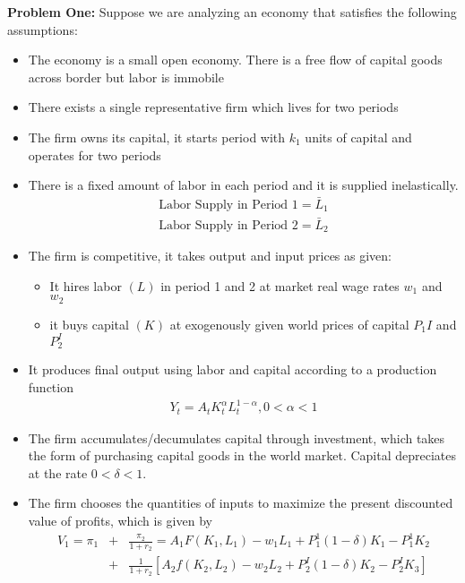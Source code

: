 \documentclass[11pt]{SelfArxOneColBMN}
\affiliation{\textsuperscript{1}\textit{John E. Walker Department of Economics,
Clemson University,Clemson, SC: email ijdavis@g.clemson.edu}}
\date{\small{Version ~\today}}
\begin{document}
\flushbottom

\maketitle

\renewcommand{\theexercise}{\arabic{exercise}}%

\textbf{Problem One:}
Suppose we are analyzing an economy that satisfies the following assumptions:
\begin{itemize}
  \item The economy is a small open economy. There is a free flow of capital goods across border but labor is immobile
  \item There exists a single representative firm which lives for two periods
  \item The firm owns its capital, it starts period with $k_1$ units of capital and operates for two periods
  \item There is a fixed amount of labor in each period and it is supplied inelastically.
  \begin{eqnarray*}
    \text{Labor Supply in Period 1} = \bar{L}_1\\
    \text{Labor Supply in Period 2} = \bar{L}_2
  \end{eqnarray*}
  \item The firm is competitive, it takes output and input prices as given:
  \begin{itemize}
    \item It hires labor $(L)$ in period 1 and 2 at market real wage rates $w_1$ and $w_2$
    \item it buys capital $(K)$ at exogenously given world prices of capital $P_1I$ and $P_2^I$
  \end{itemize}
  \item It produces final output using labor and capital according to a production function
  \begin{eqnarray*}
    Y_t = A_t K_t^\alpha L_t^{1 - \alpha}, 0 < \alpha < 1
  \end{eqnarray*}
  \item The firm accumulates/decumulates capital through investment, which takes the form of purchasing capital goods in the world market. Capital depreciates at the rate $0 < \delta < 1$.
  \item The firm chooses the quantities of inputs to maximize the present discounted value of profits, which is given by
  \begin{eqnarray*}
    V_1 = \pi_1 &+& \frac{\pi_2}{1 + r_2} = A_1F(K_1,L_1) - w_1L_1 + P_1^1(1 - \delta)K_1 - P_1^1K_2\\
     &+& \frac{1}{1 + r_2}[A_2f(K_2,L_2) - w_2L_2 + P_2^I(1 - \delta)K_2 - P_2^IK_3]
  \end{eqnarray*}
\end{itemize}
\end{document}
